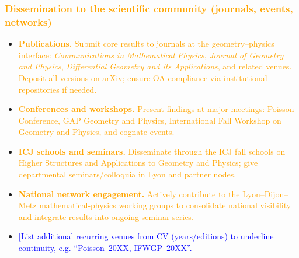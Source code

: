 \documentclass[11pt,draftproposal]{msca-pf}
\begin{document}
\subsubsection*{\textcolor{orange}{Dissemination to the scientific community (journals, events, networks)}}
\begin{itemize}[noitemsep,topsep=2pt]
  \item \textcolor{orange}{\textbf{Publications.} Submit core results to journals at the geometry–physics interface: \emph{Communications in Mathematical Physics}, \emph{Journal of Geometry and Physics}, \emph{Differential Geometry and its Applications}, and related venues. Deposit all versions on arXiv; ensure OA compliance via institutional repositories if needed.}
  \item \textcolor{orange}{\textbf{Conferences and workshops.} Present findings at major meetings: Poisson Conference, GAP Geometry and Physics, International Fall Workshop on Geometry and Physics, and cognate events.}
  \item \textcolor{orange}{\textbf{ICJ schools and seminars.} Disseminate through the ICJ fall schools on Higher Structures and Applications to Geometry and Physics; give departmental seminars/colloquia in Lyon and partner nodes.}
  \item \textcolor{orange}{\textbf{National network engagement.} Actively contribute to the Lyon–Dijon–Metz mathematical-physics working groups to consolidate national visibility and integrate results into ongoing seminar series.}
  \item \textcolor{blue}{[List additional recurring venues from CV (years/editions) to underline continuity, e.g. “Poisson~20XX, IFWGP~20XX”.]}
\end{itemize}
\end{document}
